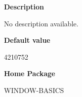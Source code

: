  
{\bf Description}

No description available.

 
{\bf Default value}

4210752

 
{\bf Home Package}

WINDOW-BASICS

